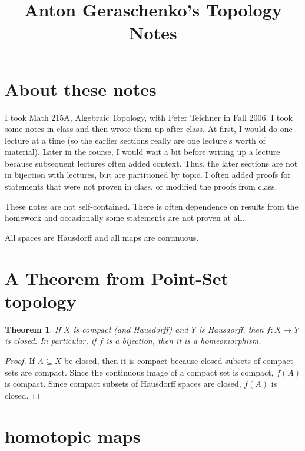 \documentclass[12pt]{article}
\theoremstyle{plain}
\newtheorem{theorem}[equation]{Theorem}
\theoremstyle{definition}
\theoremstyle{remark}
\begin{document}
 \title{\vspace*{-4\baselineskip} Anton Geraschenko's Topology Notes}
 \date{}
 \author{}
 \maketitle
 \setcounter{section}{1}
 \vspace*{-3\baselineskip}

 \section*{About these notes}
 I took Math 215A, Algebraic Topology, with Peter Teichner in Fall 2006. I took some
 notes in class and then wrote them up after class. At first, I would do one lecture at a
 time (so the earlier sections really are one lecture's worth of material). Later in the
 course, I would wait a bit before writing up a lecture because subsequent lectures often
 added context. Thus, the later sections are not in bijection with lectures, but are
 partitioned by topic. I often added proofs for statements that were not proven in class,
 or modified the proofs from class.

 These notes are not self-contained. There is often dependence on results from the
 homework and occasionally some statements are not proven at all.


 All spaces are Hausdorff and all maps are continuous.
 \section{A Theorem from Point-Set topology}
 \begin{theorem}\label{T:cmptHausbij}
   If $X$ is compact (and Hausdorff) and $Y$ is Hausdorff, then $f:X\to Y$ is closed. In
   particular, if $f$ is a bijection, then it is a homeomorphism.
 \end{theorem}
 \begin{proof}
   If $A\subseteq X$ be closed, then it is compact because closed subsets of compact sets
   are compact. Since the continuous image of a compact set is compact, $f(A)$ is
   compact. Since compact subsets of Hausdorff spaces are closed, $f(A)$ is closed.
 \end{proof}

 \section{homotopic maps}
\end{document}
